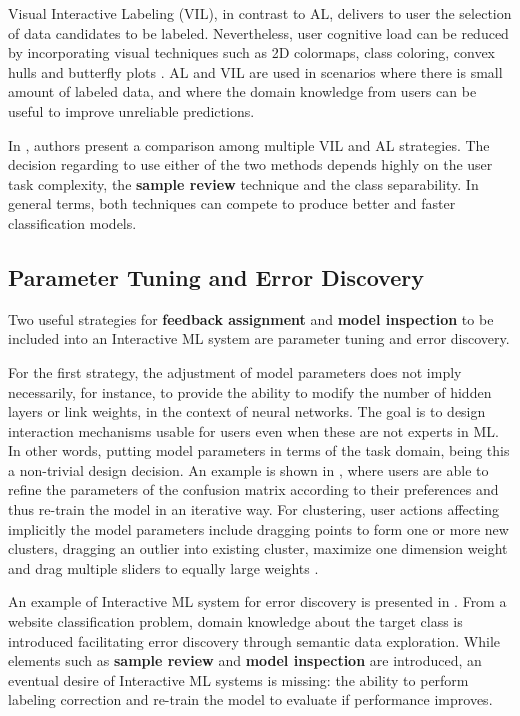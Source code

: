 Visual Interactive Labeling (VIL), in contrast to AL, delivers to user the selection of data candidates to be labeled. Nevertheless, user cognitive load can be reduced by incorporating visual techniques such as 2D colormaps, class coloring, convex hulls and butterfly plots \cite{Bernard2018b}. AL and VIL are used in scenarios where there is small amount of labeled data, and where the domain knowledge from users can be useful to improve unreliable predictions. 

In \cite{Bernard2018b}, authors present a comparison among multiple VIL and AL strategies. The decision regarding to use either of the two methods depends highly on the user task complexity, the \textbf{sample review} technique and the class separability. In general terms, both techniques can compete to produce better and faster classification models.

\subsection{Parameter Tuning and Error Discovery}
\label{subsection2.1.3}

Two useful strategies for \textbf{feedback assignment} and \textbf{model inspection} to be included into an Interactive ML system are parameter tuning and error discovery. 

For the first strategy, the adjustment of model parameters does not imply necessarily, for instance, to provide the ability to modify the number of hidden layers or link weights, in the context of neural networks. The goal is to design interaction mechanisms usable for users even when these are not experts in ML. In other words, putting model parameters in terms of the task domain, being this a non-trivial design decision. An example is shown in \cite{Kapoor2010}, where users are able to refine the parameters of the confusion matrix according to their preferences and thus re-train the model in an iterative way. For clustering, user actions affecting implicitly the model parameters include dragging points to form one or more new clusters, dragging an outlier into existing cluster, maximize one dimension weight and drag multiple sliders to equally large weights \cite{Self2016}. 

An example of Interactive ML system for error discovery is presented in \cite{Chen2018b}. From a website classification problem, domain knowledge about the target class is introduced facilitating error discovery through semantic data exploration. While elements such as \textbf{sample review} and \textbf{model inspection} are introduced, an eventual desire of Interactive ML systems is missing: the ability to perform labeling correction and re-train the model to evaluate if performance improves.

